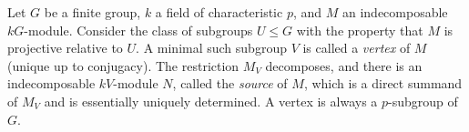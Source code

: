 Let $G$ be a finite group, $k$ a field of characteristic $p$, and $M$ an indecomposable $kG$-module. Consider the class of subgroups $U \leq G$ with the property that $M$ is projective relative to $U$. A minimal such subgroup $V$ is called a {\it vertex} of $M$ (unique up to conjugacy). The restriction $M_V$ decomposes, and there is an indecomposable $kV$-module $N$, called the {\it source} of $M$, which is a direct summand of $M_V$ and is essentially uniquely determined. A vertex is always a $p$-subgroup of $G$.
